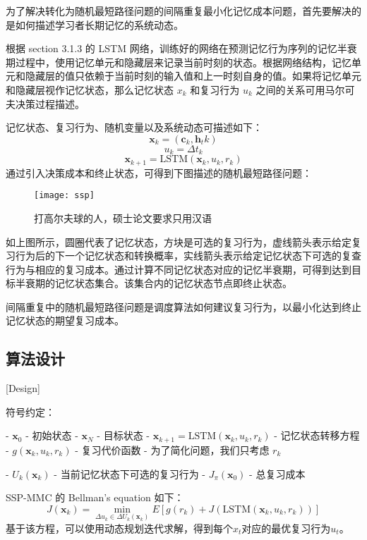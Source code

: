 为了解决转化为随机最短路径问题的间隔重复最小化记忆成本问题，首先要解决的是如何描述学习者长期记忆的系统动态。

根据 section 3.1.3 的 LSTM 网络，训练好的网络在预测记忆行为序列的记忆半衰期过程中，使用记忆单元和隐藏层来记录当前时刻的状态。根据网络结构，记忆单元和隐藏层的值只依赖于当前时刻的输入值和上一时刻自身的值。如果将记忆单元和隐藏层视作记忆状态，那么记忆状态 $x_k$ 和复习行为 $u_k$ 之间的关系可用马尔可夫决策过程描述。

记忆状态、复习行为、随机变量以及系统动态可描述如下：
\begin{equation}
\boldsymbol x_k = (\boldsymbol c_k,\boldsymbol h_tk)
\end{equation}
\begin{equation}
u_{k}=\Delta t_{k}
\end{equation}
\begin{equation}
\boldsymbol x_{k+1}=\mathrm{LSTM}(\boldsymbol x_k,u_k,r_k)
\end{equation}
通过引入决策成本和终止状态，可得到下图描述的随机最短路径问题：

\begin{figure}[htpb]
    \centering
    \texttt{[image: ssp]}
    \caption{打高尔夫球的人，硕士论文要求只用汉语}
\end{figure}

如上图所示，圆圈代表了记忆状态，方块是可选的复习行为，虚线箭头表示给定复习行为后的下一个记忆状态和转换概率，实线箭头表示给定记忆状态下可选的复查行为与相应的复习成本。通过计算不同记忆状态对应的记忆半衰期，可得到达到目标半衰期的记忆状态集合。该集合内的记忆状态节点即终止状态。

间隔重复中的随机最短路径问题是调度算法如何建议复习行为，以最小化达到终止记忆状态的期望复习成本。

\subsection{算法设计}[Design]

符号约定：

- $\boldsymbol x_0$ - 初始状态
- $\boldsymbol x_{N}$ - 目标状态
- $\boldsymbol x_{k+1} = \mathrm{LSTM}(\boldsymbol x_k,u_k,r_k)$ - 记忆状态转移方程
- $g(\boldsymbol x_k,u_k,r_k)$ - 复习代价函数
  - 为了简化问题，我们只考虑 $r_k$

- $U_k(\boldsymbol x_k)$ - 当前记忆状态下可选的复习行为
- $J_\pi(\boldsymbol x_0)$ - 总复习成本

SSP-MMC 的 Bellman's equation 如下：
\begin{equation}
J(\boldsymbol x_k) = \min\limits_{\Delta u_k \in \Delta U_k(\boldsymbol x_k)} E[g(r_k) + J(\mathrm{LSTM}(\boldsymbol x_k,u_k,r_k))]
\end{equation}
基于该方程，可以使用动态规划迭代求解，得到每个$x_t$对应的最优复习行为$u_t$。

